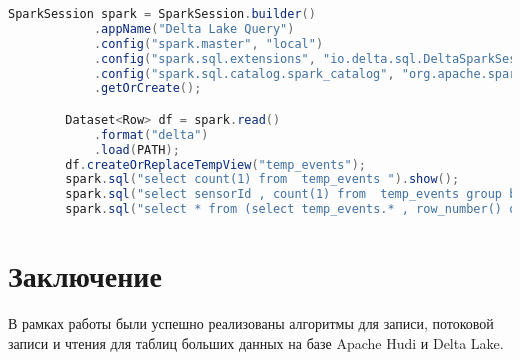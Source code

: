 \documentclass[%
bachelor,    %
subf,        %
href,        %
colorlinks,  %
]{disser}
\begin{document}
\begin{lstlisting}[caption={Выполнение запросов к Delta Lake таблице},captionpos=b,label={lst:6},language=Java]	
        SparkSession spark = SparkSession.builder()
            .appName("Delta Lake Query")
            .config("spark.master", "local")
            .config("spark.sql.extensions", "io.delta.sql.DeltaSparkSessionExtension")
            .config("spark.sql.catalog.spark_catalog", "org.apache.spark.sql.delta.catalog.DeltaCatalog")
            .getOrCreate();

        Dataset<Row> df = spark.read()
            .format("delta")
            .load(PATH);
        df.createOrReplaceTempView("temp_events");
        spark.sql("select count(1) from  temp_events ").show();
        spark.sql("select sensorId , count(1) from  temp_events group by sensorId").show();
        spark.sql("select * from (select temp_events.* , row_number() over (partition by sensorId order by timestamp desc) as rnk from temp_events) where rnk=1").show();
\end{lstlisting}	

\newpage
\section{Заключение}
В рамках работы были успешно реализованы алгоритмы для записи, потоковой записи и чтения для таблиц больших данных на базе Apache Hudi и Delta Lake.
\printbibliography[heading=bibintoc]
	
\appendix
	
	
\end{document}
